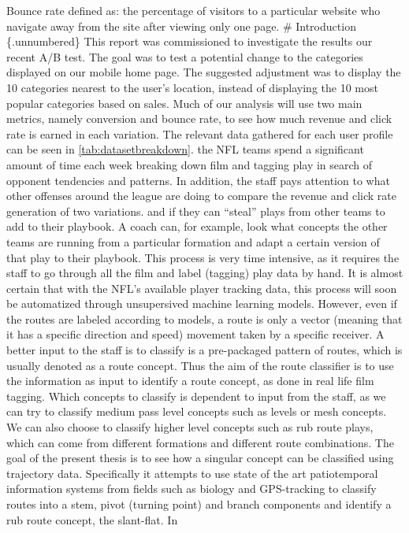\documentclass[12pt,oneside]{dukestatscithesis}
\theoremstyle{definition}
\theoremstyle{definition}
\theoremstyle{definition}
\theoremstyle{remark}
\begin{document}
Bounce rate defined as: the percentage of visitors to a particular
website who navigate away from the site after viewing only one page. \#
Introduction \{.unnumbered\} This report was commissioned to investigate
the results our recent A/B test. The goal was to test a potential change
to the categories displayed on our mobile home page. The suggested
adjustment was to display the 10 categories nearest to the user's
location, instead of displaying the 10 most popular categories based on
sales. Much of our analysis will use two main metrics, namely conversion
and bounce rate, to see how much revenue and click rate is earned in
each variation. The relevant data gathered for each user profile can be
seen in \ref{tab:datasetbreakdown}. the NFL teams spend a significant
amount of time each week breaking down film and tagging play in search
of opponent tendencies and patterns. In addition, the staff pays
attention to what other offenses around the league are doing to compare
the revenue and click rate generation of two variations. and if they can
``steal'' plays from other teams to add to their playbook. A coach can,
for example, look what concepts the other teams are running from a
particular formation and adapt a certain version of that play to their
playbook. This process is very time intensive, as it requires the staff
to go through all the film and label (tagging) play data by hand. It is
almost certain that with the NFL's available player tracking data, this
process will soon be automatized through unsupersived machine learning
models. However, even if the routes are labeled according to models, a
route is only a vector (meaning that it has a specific direction and
speed) movement taken by a specific receiver. A better input to the
staff is to classify is a pre-packaged pattern of routes, which is
usually denoted as a route concept. Thus the aim of the route classifier
is to use the information as input to identify a route concept, as done
in real life film tagging. Which concepts to classify is dependent to
input from the staff, as we can try to classify medium pass level
concepts such as levels or mesh concepts. We can also choose to classify
higher level concepts such as rub route plays, which can come from
different formations and different route combinations. The goal of the
present thesis is to see how a singular concept can be classified using
trajectory data. Specifically it attempts to use state of the art
patiotemporal information systems from fields such as biology and
GPS-tracking to classify routes into a stem, pivot (turning point) and
branch components and identify a rub route concept, the slant-flat. In
\end{document}
